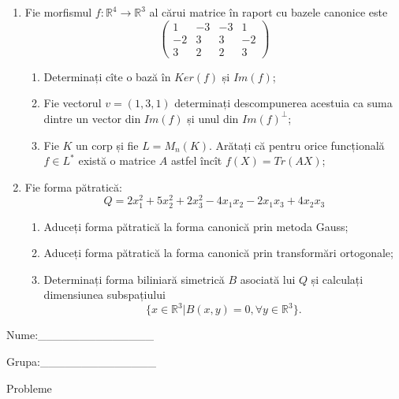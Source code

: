 \documentclass{article}
\begin{document}
\begin{enumerate}
 \item Fie morfismul $f:\mathbb{R}^4 \to \mathbb{R}^3$ al cărui matrice în raport cu bazele canonice este
$$\begin{pmatrix}
1&-3&-3&1\\
-2&3&3&-2\\
3&2&2&3
\end{pmatrix}$$

\begin{enumerate}
\item Determinați cîte o bază în $Ker(f)$ și $Im(f)$;
\item Fie vectorul $v=(1,3,1)$ determinați descompunerea acestuia ca suma dintre un vector din $Im(f)$ și unul din $Im(f)^\perp$;
\item Fie $K$ un corp și fie $L=M_n(K)$. Arătați că pentru orice funcțională $f \in L^*$ există o matrice $A$ astfel încît $f(X)=Tr(AX)$;
\end{enumerate}
\item Fie forma pătratică:
$$Q= 2x_1^2+5x_2^2+2x_3^2-4x_1x_2-2x_1x_3+4x_2x_3$$

\begin{enumerate}
\item Aduceți forma pătratică la forma canonică prin metoda Gauss;
\item Aduceți forma pătratică la forma canonică prin transformări ortogonale;
\item Determinați forma biliniară simetrică $B$ asociată lui $Q$ și calculați dimensiunea subspațiului
$$\{x \in \mathbb{R}^3 | B(x,y)=0,\forall y \in \mathbb{R}^3\}.$$

\end{enumerate}
\end{enumerate}
\newpage
\begin{flushright}
Nume:\_\_\_\_\_\_\_\_\_\_\_\_\_\_
 
 
Grupa:\_\_\_\_\_\_\_\_\_\_\_\_\_\_
\end{flushright}
\begin{center}
\vspace{2cm}
{\Large Probleme}
\vspace{2cm}
\end{center}
\end{document}
